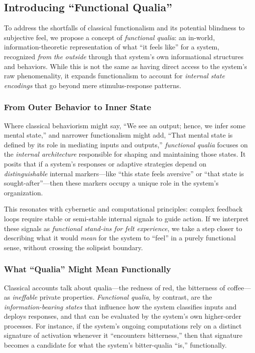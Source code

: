 \documentclass[12pt]{article}
\begin{document}
\subsection{Introducing ``Functional Qualia''}

To address the shortfalls of classical functionalism and its potential blindness to subjective feel, we propose a concept of \textit{functional qualia}: an in-world, information-theoretic representation of what ``it feels like'' for a system, recognized \textit{from the outside} through that system's own informational structures and behaviors. While this is not the same as having direct access to the system's raw phenomenality, it expands functionalism to account for \textit{internal state encodings} that go beyond mere stimulus-response patterns.

\subsubsection{From Outer Behavior to Inner State}

Where classical behaviorism might say, ``We see an output; hence, we infer some mental state,'' and narrower functionalism might add, ``That mental state is defined by its role in mediating inputs and outputs,'' \textit{functional qualia} focuses on the \textit{internal architecture} responsible for shaping and maintaining those states. It posits that if a system's responses or adaptive strategies depend on \textit{distinguishable} internal markers---like ``this state feels aversive'' or ``that state is sought-after''---then these markers occupy a unique role in the system's organization.

This resonates with cybernetic and computational principles: complex feedback loops require stable or semi-stable internal signals to guide action. If we interpret these signals as \textit{functional stand-ins for felt experience}, we take a step closer to describing what it would \textit{mean} for the system to ``feel'' in a purely functional sense, without crossing the solipsist boundary.

\subsubsection{What ``Qualia'' Might Mean Functionally}

Classical accounts talk about qualia---the redness of red, the bitterness of coffee---as \textit{ineffable} private properties. \textit{Functional qualia}, by contrast, are the \textit{information-bearing states} that influence how the system classifies inputs and deploys responses, and that can be evaluated by the system's own higher-order processes. For instance, if the system's ongoing computations rely on a distinct signature of activation whenever it ``encounters bitterness,'' then that signature becomes a candidate for what the system's bitter-qualia ``is,'' functionally.
\end{document}
